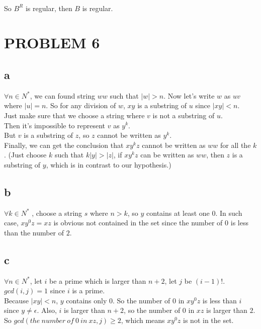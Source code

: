 \documentclass{ctexart}
\begin{document}
\\

So $B^R$ is regular, then $B$ is regular.

\section{PROBLEM 6}
\subsection{a}
$\forall n \in N^* $, we can found string $ww$ such that $|w|>n$.
Now let's write $w$ as $uv$ where $|u|=n$. So for any division of 
$w$, $xy$ is a substring of $u$ since $|xy|<n$.\\
Just make sure that we choose a string where $v$ is not a substring of $u$.\\
 Then it's impossible to represent $v$ as $y^k$.\\
  But $v$ is a substring of $z$, so $z$ cannot be written as $y^k$.\\
Finally, we can get the conclusion that $xy^kz$ cannot be
written as $ww$ for all the $k$. (Just choose $k$ such that 
$k|y|>|z|$, if $xy^kz$ can be written as $ww$, then $z$ is a substring of $y$,
 which is in contrast to our hypothesis.)

\subsection{b}
$\forall k \in N^* $ , choose a string $s$ where $n>k$, so $y$ contains at least one 
$0$. In such case, $xy^0z=xz$ is obvious not contained in the set since the number
of $0$ is less than the number of $2$.

\subsection{c}
$\forall n \in N^*$, let $i$ be a prime which is larger than $n+2$, let $j$ be $(i-1)!$.\\
$gcd(i,j)=1$ since $i$ is a prime.\\
Because $|xy|<n$, $y$ contains only $0$. So the number of $0$ in $xy^0z$ is less than
$i$ since $y \ne \epsilon$. Also, $i$ is larger than $n+2$, so the number of $0$ in $xz$ is larger
than $2$.\\
So $gcd(the\ number\ of\ 0\ in\ xz, j) \geq 2$, which means $xy^0z$ is not in the set.
\end{document}

